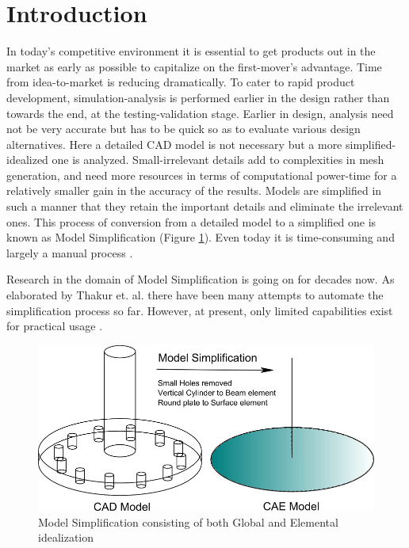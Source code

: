 
\section{Introduction}

In today's competitive environment it is essential to get products out in the market as early as possible to capitalize on the first-mover's advantage. Time from idea-to-market is reducing dramatically. To cater to rapid product development, simulation-analysis is performed earlier in the design rather than towards the end, at the testing-validation stage.  Earlier in design, analysis need not be very accurate but has to be quick so as to evaluate various design alternatives. Here a detailed CAD model is not necessary but a more simplified-idealized one is analyzed. Small-irrelevant details add to complexities in mesh generation, and need more resources in terms of computational power-time for a relatively smaller gain in the accuracy of the results. Models are simplified in such a manner that they retain the important details and eliminate the irrelevant ones. This process of conversion from a  detailed model to a simplified one is known as Model Simplification (Figure \ref{ModelSimplification}). Even today it is time-consuming and largely a manual process \citep{Russ2012}. 

Research in the domain of Model Simplification is going on for decades now. As elaborated by Thakur et. al. \citep{Thakur2009} there have been many attempts to automate the simplification process so far. However, at present, only limited capabilities exist for practical usage\citep{Lee2009} .
	

	\begin{figure} [h]
		\centering
		\includegraphics[scale=0.7]{..//Common/images/ModelSimplification.png}
		\vspace{\abovecaptionskip}
		\caption{Model Simplification consisting of both Global and Elemental idealization}
		\label{ModelSimplification}
	\end{figure}

